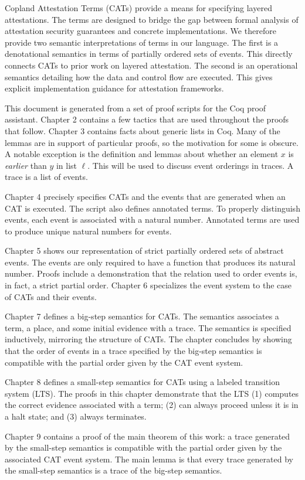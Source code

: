 \documentclass[12pt]{report}
\begin{document}
\tableofcontents


Copland Attestation Terms (CATs) provide a means for
specifying layered attestations.  The terms are designed to bridge the
gap between formal analysis of attestation security guarantees and
concrete implementations.  We therefore provide two semantic
interpretations of terms in our language.  The first is a denotational
semantics in terms of partially ordered sets of events.  This directly
connects CATs to prior work on layered attestation.  The second is an
operational semantics detailing how the data and control flow are
executed.  This gives explicit implementation guidance for attestation
frameworks.

This document is generated from a set of proof scripts for the Coq
proof assistant.  Chapter 2 contains a few tactics that are used
throughout the proofs that follow.  Chapter 3 contains facts about
generic lists in Coq.  Many of the lemmas are in support of particular
proofs, so the motivation for some is obscure.  A notable exception
is the definition and lemmas about whether an element $x$ is
\emph{earlier} than $y$ in list $\ell$.  This will be used to discuss
event orderings in traces.  A trace is a list of events.

Chapter 4 precisely specifies CATs and the events that are generated
when an CAT is executed.  The script also defines annotated terms.
To properly distinguish events, each event is associated with a
natural number.  Annotated terms are used to produce unique natural
numbers for events.

Chapter 5 shows our representation of strict partially ordered sets of
abstract events.  The events are only required to have a function that
produces its natural number.  Proofs include a demonstration that the
relation used to order events is, in fact, a strict partial order.
Chapter 6 specializes the event system to the case of CATs and their
events.

Chapter 7 defines a big-step semantics for CATs.  The semantics
associates a term, a place, and some initial evidence with a trace.
The semantics is specified inductively, mirroring the structure of
CATs.  The chapter concludes by showing that the order of events in a
trace specified by the big-step semantics is compatible with the
partial order given by the CAT event system.

Chapter 8 defines a small-step semantics for CATs using a labeled
transition system (LTS).  The proofs in this chapter demonstrate that
the LTS (1) computes the correct evidence associated with a term; (2) can
always proceed unless it is in a halt state; and (3) always
terminates.

Chapter 9 contains a proof of the main theorem of this work: a trace
generated by the small-step semantics is compatible with the partial
order given by the associated CAT event system.  The main lemma is
that every trace generated by the small-step semantics is a trace of
the big-step semantics.


\end{document}
